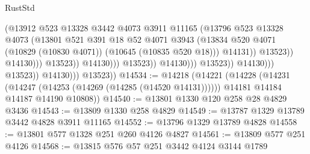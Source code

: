 \begin{lexlean}{RustStd}
\begin{coremodule}
                                                        (@13912
                                                          @523
                                                          @13328
                                                          @3442
                                                          @4073
                                                          @3911
                                                          @11165
                                                          (@13796
                                                            @523
                                                            @13328
                                                            @4073
                                                            (@13801
                                                              @521
                                                              @391
                                                              @18
                                                              @52
                                                              @4071
                                                              @3943
                                                              (@13834
                                                                @520
                                                                @4071
                                                                (@10829 (@10830 @4071))
                                                                (@10645 (@10835 @520 @18)))
                                                              @14131))
                                                          @13523))
                                                      @14130)))
                                                @13523))
                                            @14130)))
                                      @13523))
                                  @14130)))
                            @13523))
                        @14130)))
                  @13523))
              @14130)))
        @13523))
@14534 := @14218
    (@14221
      (@14228
        (@14231 (@14247 (@14253 (@14269 (@14285 (@14520 @14131))))))
        @14181
        @14184
        @14187
        @14190
        @10808))
@14540 := @13801 @1330 @120 @258 @28 @4829 @3436
@14543 := @13809 @1330 @258 @4829
@14549 := @13787 @1329 @13789 @3442 @4828 @3911 @11165
@14552 := @13796 @1329 @13789 @4828
@14558 := @13801 @577 @1328 @251 @260 @4126 @4827
@14561 := @13809 @577 @251 @4126
@14568 := @13815 @576 @57 @251 @3442 @4124 @3144 @1789

\end{coremodule}
\end{lexlean}
